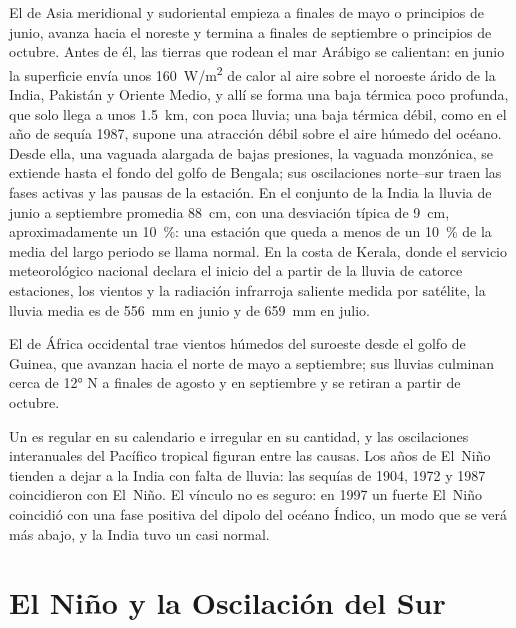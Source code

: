 El  de Asia meridional y sudoriental empieza a finales de mayo o principios de junio, avanza
hacia el noreste y termina a finales de septiembre o principios de octubre. Antes de él, las tierras que rodean el
mar Arábigo se calientan: en junio la superficie envía unos \qty{160}{W/m^2} de calor al aire sobre
el noroeste árido de la India, Pakistán y Oriente Medio, y allí se forma una baja térmica poco profunda,
que solo llega a unos \qty{1.5}{km}, con poca lluvia; una baja térmica débil, como en el año de sequía
1987, supone una atracción débil sobre el aire húmedo del océano. Desde ella, una vaguada alargada de bajas presiones, la vaguada
monzónica, se extiende hasta el fondo del golfo de Bengala; sus oscilaciones norte--sur traen las fases
activas y las pausas de la estación. En el conjunto de la India la lluvia de junio a septiembre promedia
\qty{88}{cm}, con una desviación típica de \qty{9}{cm}, aproximadamente un \qty{10}{\percent}: una estación que queda a menos de un
\qty{10}{\percent} de la media del largo periodo se llama normal. En la costa de Kerala, donde el
servicio meteorológico nacional declara el inicio del  a partir de la lluvia de catorce estaciones,
los vientos y la radiación infrarroja saliente medida por satélite, la lluvia media es de
\qty{556}{mm} en junio y de \qty{659}{mm} en julio.

El  de África occidental trae vientos húmedos del suroeste desde el golfo de Guinea, que avanzan
hacia el norte de mayo a septiembre; sus lluvias culminan cerca de \ang{12} N a finales de agosto y en septiembre y
se retiran a partir de octubre.

Un  es regular en su calendario e irregular en su cantidad, y las oscilaciones interanuales del
Pacífico tropical figuran entre las causas. Los años de El~Niño tienden a dejar a la India con falta de lluvia: las
sequías de 1904, 1972 y 1987 coincidieron con El~Niño. El vínculo no es seguro: en 1997 un fuerte
El~Niño coincidió con una fase positiva del dipolo del océano Índico, un modo que se verá más abajo, y la India
tuvo un  casi normal.

\section{El Niño y la Oscilación del Sur}\label{sec:b2:climate-variability:enso}

